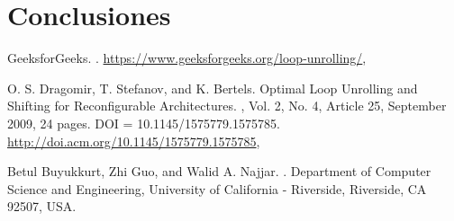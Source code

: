 \documentclass[a4paper,twocolumn]{article}
\begin{document}
	
\section{Conclusiones}



	
\begin{thebibliography}{99} %

    GeeksforGeeks.
    .
    \newblock \url{https://www.geeksforgeeks.org/loop-unrolling/}, \newblock [online]
    
    O. S. Dragomir, T. Stefanov, and K. Bertels.
    \newblock Optimal Loop Unrolling and Shifting for Reconfigurable Architectures.
    , Vol. 2, No. 4, Article 25, September 2009, 24 pages.
    \newblock DOI = 10.1145/1575779.1575785.
    \newblock \url{http://doi.acm.org/10.1145/1575779.1575785}, \newblock [online]

    Betul Buyukkurt, Zhi Guo, and Walid A. Najjar.
    .
    \newblock Department of Computer Science and Engineering, University of California - Riverside, Riverside, CA 92507, USA.
    
\end{thebibliography}


	
	
\end{document}
